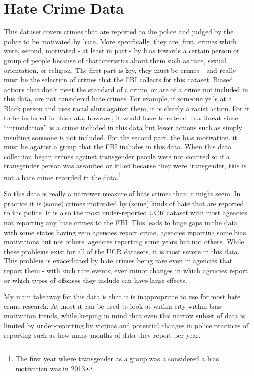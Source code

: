\documentclass[
  12pt,
  openany]{book}
\begin{document}
\hypertarget{hate_crimes}{%
\chapter{Hate Crime Data}\label{hate_crimes}}

This dataset covers crimes that are reported to the police and judged by the police to be motivated by hate. More specifically, they are, first, crimes which were, second, motivated - at least in part - by bias towards a certain person or group of people because of characteristics about them such as race, sexual orientation, or religion. The first part is key, they must be crimes - and really must be the selection of crimes that the FBI collects for this dataset. Biased actions that don't meet the standard of a crime, or are of a crime not included in this data, are not considered hate crimes. For example, if someone yells at a Black person and uses racial slurs against them, it is clearly a racist action. For it to be included in this data, however, it would have to extend to a threat since ``intimidation'' is a crime included in this data but lesser actions such as simply insulting someone is not included. For the second part, the bias motivation, it must be against a group that the FBI includes in this data. When this data collection began crimes against transgender people were not counted so if a transgender person was assaulted or killed because they were transgender, this is not a hate crime recorded in the data.\footnote{The first year where transgender as a group was a considered a bias motivation was in 2013.}

So this data is really a narrower measure of hate crimes than it might seem. In practice it is (some) crimes motivated by (some) kinds of hate that are reported to the police. It is also the most under-reported UCR dataset with most agencies not reporting any hate crimes to the FBI. This leads to huge gaps in the data with some states having zero agencies report crime, agencies reporting some bias motivations but not others, agencies reporting some years but not others. While these problems exist for all of the UCR datasets, it is most severe in this data. This problem is exacerbated by hate crimes being rare even in agencies that report them - with such rare events, even minor changes in which agencies report or which types of offenses they include can have large effects.

My main takeaway for this data is that it is inappropriate to use for most hate crime research. At most it can be used to look at within-city within-bias-motivation trends, while keeping in mind that even this narrow subset of data is limited by under-reporting by victims and potential changes in police practices of reporting such as how many months of data they report per year.
\end{document}
